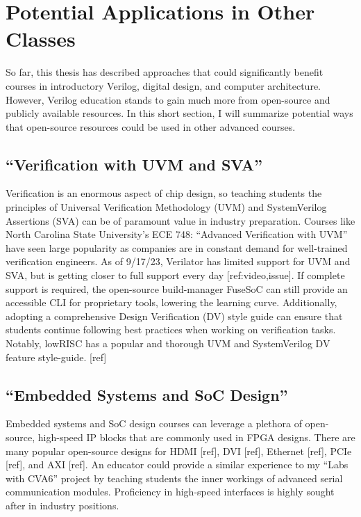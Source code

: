 
\chapter{Potential Applications in Other Classes}
\label{chapter:other_classes}

So far, this thesis has described approaches that could significantly benefit courses in introductory Verilog, digital design, and computer architecture. However, Verilog education stands to gain much more from open-source and publicly available resources. In this short section, I will summarize potential ways that open-source resources could be used in other advanced courses.

\section{``Verification with UVM and SVA''}

Verification is an enormous aspect of chip design, so teaching students the principles of Universal Verification Methodology (UVM) and SystemVerilog Assertions (SVA) can be of paramount value in industry preparation. Courses like North Carolina State University's ECE 748: ``Advanced Verification with UVM'' have seen large popularity as companies are in constant demand for well-trained verification engineers. As of 9/17/23, Verilator has limited support for UVM and SVA, but is getting closer to full support every day [ref:video,issue]. If complete support is required, the open-source build-manager FuseSoC can still provide an accessible CLI for proprietary tools, lowering the learning curve. Additionally, adopting a comprehensive Design Verification (DV) style guide can ensure that students continue following best practices when working on verification tasks. Notably, lowRISC has a popular and thorough UVM and SystemVerilog DV feature style-guide. [ref]

\section{``Embedded Systems and SoC Design''}

Embedded systems and SoC design courses can leverage a plethora of open-source, high-speed IP blocks that are commonly used in FPGA designs. There are many popular open-source designs for HDMI [ref], DVI [ref], Ethernet [ref], PCIe [ref], and AXI [ref]. An educator could provide a similar experience to my ``Labs with CVA6'' project by teaching students the inner workings of advanced serial communication modules. Proficiency in high-speed interfaces is highly sought after in industry positions.

